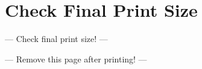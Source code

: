 \chapter*{Check Final Print Size}

\begin{center}
{\Large --- Check final print size! ---}

\bigskip


\bigskip

{\Large --- Remove this page after printing! ---}

\end{center}

